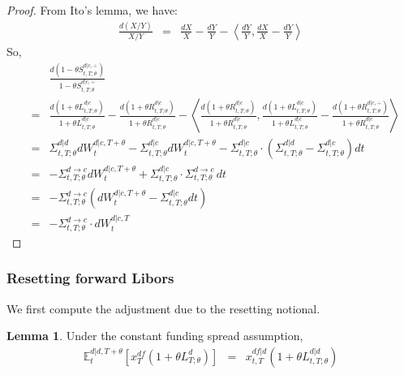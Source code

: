 \documentclass[11pt,english]{amsart}
\newcommand{\RN}{\mathrm{RN}}
\newcommand{\EE}{\mathbb{E}}
\theoremstyle{definition}
\newtheorem{lemm}{Lemma}
\begin{document}
\begin{proof}
From Ito's lemma, we have:
\begin{eqnarray*}
	\frac{d(X/Y)}{X/Y} 
	&=&  \frac{dX}{X} -  \frac{dY}{Y} 
	- \left\langle  \frac{dY}{Y}    ,  \frac{dX}{X} -  \frac{dY}{Y}  \right\rangle 
\end{eqnarray*} 
So, 
\begin{eqnarray*}
	& & \frac{d(1 - \theta S^{d|c,\div}_{t,T;\theta})}{1 - \theta S^{d|c,\div}_{t,T;\theta}} \\
	&=&  \frac{d(1+\theta L^{d|c}_{t,T;\theta})}{1+\theta L^{d|c}_{t,T;\theta}} 
	-  \frac{d(1+\theta R^{d|c}_{t,T;\theta})}{1+\theta R^{d|c}_{t,T;\theta}} 
	- \left\langle   \frac{d(1+\theta R^{d|c}_{t,T;\theta})}{1+\theta R^{d|c}_{t,T;\theta}}   ,  \frac{d(1+\theta L^{d|c}_{t,T;\theta})}{1+\theta L^{d|c}_{t,T;\theta}}  -  \frac{d(1+\theta R^{d|c,\div}_{t,T;\theta})}{1+\theta R^{d|c}_{t,T;\theta}} \right\rangle \\
	&=& \Sigma^{d|d}_{t,T;\theta}dW^{d|c,T+\theta}_t - \Sigma^{d|c}_{t,T;\theta}dW^{d|c,T+\theta}_t - \Sigma^{d|c}_{t,T;\theta}\cdot (\Sigma^{d|d}_{t,T;\theta} - \Sigma^{d|c}_{t,T;\theta})dt \\
	&=& -\Sigma^{d\to c}_{t,T;\theta}dW^{d|c,T+\theta}_t + \Sigma^{d|c}_{t,T;\theta}\cdot \Sigma^{d\to c}_{t,T;\theta} \, dt \\
	&=& -\Sigma^{d\to c}_{t,T;\theta}\left( dW^{d|c,T+\theta}_t - \Sigma^{d|c}_{t,T;\theta} dt\right) \\
	&=& -\Sigma^{d\to c}_{t,T;\theta} \cdot dW^{d|c,T}_t 
\end{eqnarray*} 
\end{proof}


\subsubsection{Resetting forward Libors}



We first compute the adjustment due to the resetting notional.
\begin{lemm}
Under the constant funding spread assumption,  
\begin{eqnarray}
	 \EE^{d|d,T+\theta}_t\left[ x^{df}_T(1+\theta L^{d}_{T;\theta} )\right] 
	&=& x^{df|d}_{t,T}   \left( 1+\theta L^{d|d}_{t,T;\theta} \right)
\end{eqnarray} 
\end{lemm}
\end{document}
